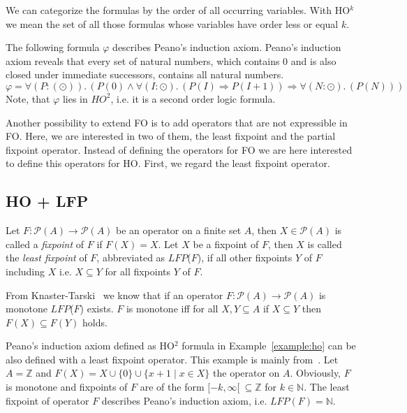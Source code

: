 We can categorize the formulas by the order of all occurring variables. With HO$^k$ we mean the set of all those
formulas whose variables have order less or equal $k$.

\begin{example}{\cite{vanBenthem2001higher}}
    \label{example:ho}
    The following formula $\varphi$ describes Peano's induction axiom. Peano's induction axiom reveals that every set
    of natural numbers, which contains $0$ and is also closed under immediate successors, contains all natural numbers.
    \[\varphi = \forall (P\colon(\odot)).\,(P(0) \wedge \forall (I\colon\odot).\,(P(I) \Rightarrow P(I + 1)) \Rightarrow
    \forall (N \colon\odot).\,(P(N)))\]
    Note, that $\varphi$ lies in $\mathit{HO}^2$, i.e. it is a second order logic formula.
\end{example}

Another possibility to extend FO is to add operators that are not expressible in FO. Here, we are interested in two
of them, the least fixpoint and the partial fixpoint operator. Instead of defining the operators for FO we are
here interested to define this operators for HO. First, we regard the least fixpoint operator.

\subsection{HO + LFP}
\label{subsec:hoPlusLfp}

\begin{definition}
   Let $F\colon \mathscr{P}(A) \rightarrow \mathscr{P}(A)$ be an operator on a finite set $A$, then $X \in \mathscr{P}
   (A)$
   is called a \emph{fixpoint} of $F$ if $F(X) = X$. Let $X$ be a fixpoint of $F$, then $X$ is called the \emph{least
   fixpoint} of $F$, abbreviated as $\mathit{LFP}$($F$), if all other fixpoints $Y$ of $F$ including $X$ i.e. $X
   \subseteq Y$ for all fixpoints $Y$ of $F$.
\end{definition}

From Knaster-Tarski~\cite{tarski1955lattice} we know that if an operator $F\colon \mathscr{P}(A) \rightarrow
\mathscr{P}(A)$ is monotone $\mathit{LFP}$($F$) exists. $F$ is monotone iff for all $X, Y \subseteq A$ if $X
\subseteq Y$ then $F(X) \subseteq F(Y)$ holds.

\begin{example}
    \label{example:lfp}
    Peano's induction axiom defined as HO$^2$ formula in Example~\ref{example:ho} can be also defined with a least
    fixpoint operator. This example is mainly from~\cite{hetzl2017higher}. Let $A = \mathbb{Z}$ and $F(X) = X \cup \{0\} \cup
    \{x + 1 \mid x \in X\}$ the operator on $A$. Obviously, $F$ is monotone and fixpoints of $F$ are of the form
    $[-k, \infty[~\subseteq\mathbb{Z}$ for $k \in \mathbb{N}$. The least fixpoint of operator $F$ describes Peano's
    induction axiom, i.e. $\mathit{LFP}(F) = \mathbb{N}$.
\end{example}

